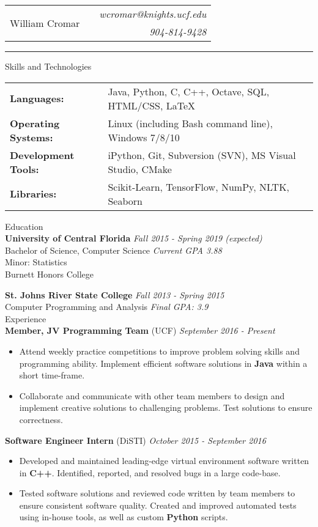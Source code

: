 \documentclass[letterpaper,11pt,oneside]{article}
\newcommand{\mkheader}[3]{
  {\fontfamily{pag}\selectfont
  \begin{tabularx}{\textwidth}{lXr}
    \multirow{2}{*}{\Huge #1} && \emph{#2}
    \\ && \emph{#3}
  \end{tabularx}
  }
  \vspace{2pt}
  \hrule
}
\newcommand{\resheader}[2][]{
  \vspace{9pt}
  {\LARGE #2} #1
  \\
}
\newcommand{\ressubheader}[3][]{
  \vspace{6pt}
  {\large \textbf{#2} #1} \hfill \emph{#3}
  \\
}
\newcommand{\resskill}[1]{\textbf{#1}}
\begin{document}
\mkheader{William Cromar}{wcromar@knights.ucf.edu}{904-814-9428}

\resheader{Skills and Technologies}
\vspace{6pt}
\begin{tabular}{>{\bfseries}l@{\hskip .25cm} l}
  Languages: & Java, Python, C, C++, Octave, SQL, HTML/CSS, LaTeX \\
  Operating Systems: & Linux (including Bash command line), Windows 7/8/10 \\
  Development Tools: & iPython, Git, Subversion (SVN), MS Visual Studio, CMake \\
  Libraries: & Scikit-Learn, TensorFlow, NumPy, NLTK, Seaborn
\end{tabular}


\resheader{Education}
\ressubheader{University of Central Florida}{Fall 2015 - Spring 2019 (expected)}
Bachelor of Science, Computer Science \hfill \emph{Current GPA 3.88} \\
Minor: Statistics \\
Burnett Honors College

\ressubheader{St. Johns River State College}{Fall 2013 - Spring 2015}
Computer Programming and Analysis \hfill \emph{Final GPA: 3.9} \\

\resheader{Experience}
\ressubheader[(UCF)]{Member, JV Programming Team}{September 2016 - Present}
\begin{itemize}
  \item Attend weekly practice competitions to improve problem solving skills
    and programming ability. Implement efficient software solutions in
    \resskill{Java} within a short time-frame. 
  \item Collaborate and communicate with other team members to design and
    implement creative solutions to challenging problems. Test solutions to
    ensure correctness.
\end{itemize}

\ressubheader[(DiSTI)]{Software Engineer Intern}{October 2015 - September 2016}
\begin{itemize}
  \item Developed and maintained leading-edge virtual environment software
    written in \resskill{C++}. Identified, reported, and resolved bugs in a
    large code-base.
  \item Tested software solutions and reviewed code written by team members to
    ensure consistent software quality. Created and improved automated tests
    using in-house tools, as well as custom \resskill{Python} scripts.
\end{itemize}
\end{document}
